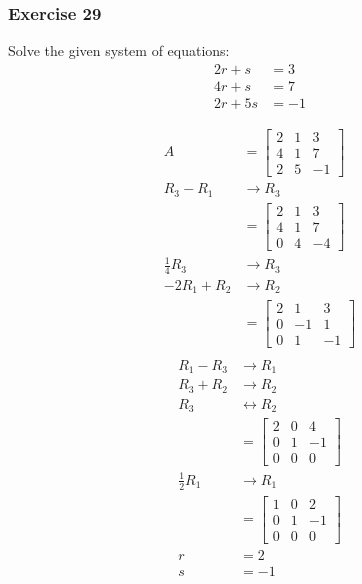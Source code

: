 \documentclass{math}
\begin{document}
\subsubsection*{Exercise 29}
Solve the given system of equations:
\begin{align*}
  2r+s &= 3 \\
  4r+s &= 7 \\
  2r+5s &= -1
\end{align*}
\begin{multicols}{2}
  \begin{align*}
    A &= \begin{bmatrix}
      2 & 1 & 3 \\
      4 & 1 & 7 \\
      2 & 5 & -1
    \end{bmatrix} \\
    R_3-R_1 &\to R_3 \\
    &= \begin{bmatrix}
      2 & 1 & 3 \\
      4 & 1 & 7 \\
      0 & 4 & -4
    \end{bmatrix} \\
    \frac{1}{4}R_3 &\to R_3 \\
    -2R_1+R_2 &\to R_2 \\
    &= \begin{bmatrix}
      2 & 1 & 3 \\
      0 & -1 & 1 \\
      0 & 1 & -1
    \end{bmatrix} \\
  \end{align*}
  \begin{align*}
    R_1-R_3 &\to R_1 \\
    R_3+R_2 &\to R_2 \\
    R_3 &\leftrightarrow R_2 \\
    &= \begin{bmatrix}
      2 & 0 & 4 \\
      0 & 1 & -1 \\
      0 & 0 & 0
    \end{bmatrix} \\
    \frac{1}{2}R_1 &\to R_1 \\
    &= \begin{bmatrix}
      1 & 0 & 2 \\
      0 & 1 & -1 \\
      0 & 0 & 0
    \end{bmatrix} \\
    r &= 2 \\
    s &= -1
  \end{align*}
\end{multicols}
\end{document}
